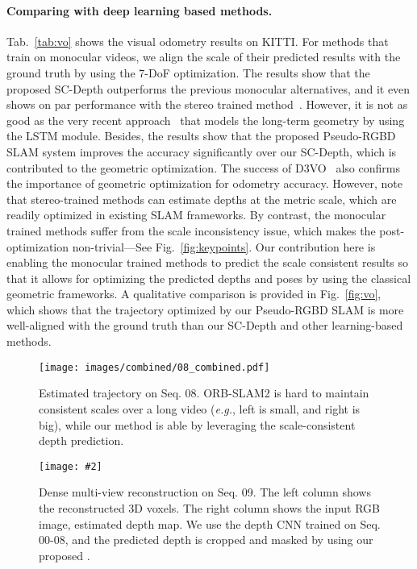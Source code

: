\documentclass[twocolumn]{svjour3}
\renewcommand{\cite}[1]{\textcolor{blue}{\citep{#1}}}
\def\eg{\emph{e.g.}}
\newcommand{\figref}[1]{Fig.~\ref{#1}}
\newcommand{\tabref}[1]{Tab.~\ref{#1}}
\newcommand{\addImg}[2][0.495]{\texttt{[image: \#2]}}
\begin{document}
\paragraph{Comparing with deep learning based methods.}
\tabref{tab:vo} shows the visual odometry results on KITTI.
For methods that train on monocular videos,
we align the scale of their predicted results with the ground truth by using the 7-DoF optimization.
The results show that the proposed SC-Depth outperforms the previous monocular alternatives,
and it even shows on par performance with the stereo trained method~\cite{li2018undeepvo}.
However, it is not as good as the very recent approach~\cite{zou2020learning} that models the long-term geometry by using the LSTM module.
Besides, the results show that the proposed Pseudo-RGBD SLAM system improves the accuracy significantly over our SC-Depth,
which is contributed to the geometric optimization.
The success of D3VO~\cite{yang2020d3vo} also confirms the importance of geometric optimization for odometry accuracy.
However, note that stereo-trained methods can estimate depths at the metric scale,
which are readily optimized in existing SLAM frameworks.
By contrast, the monocular trained methods suffer from the scale inconsistency issue,
which makes the post-optimization non-trivial---See \figref{fig:keypoints}.
Our contribution here is enabling the monocular trained methods to predict the scale consistent results
so that it allows for optimizing the predicted depths and poses by using the classical geometric frameworks.
A qualitative comparison is provided in \figref{fig:vo},
which shows that the trajectory optimized by our Pseudo-RGBD SLAM is more well-aligned with the ground truth than our SC-Depth and other learning-based methods.





\begin{figure}[t]
\centering
\texttt{[image: images/combined/08\_combined.pdf]} \\
\caption{Estimated trajectory on Seq. 08. 
ORB-SLAM2 is hard to maintain consistent scales over a long video (\eg, left is small, and right is big),
while our method is able by leveraging the scale-consistent depth prediction.
}
\label{fig:scale}
\end{figure}


\begin{figure*}[t]
  \centering
  \addImg[1]{demo-screenshot-03.pdf}
  \caption{Dense multi-view reconstruction on Seq. 09. 
    The left column shows the reconstructed 3D voxels. 
    The right column shows the input RGB image, estimated depth map.
    We use the depth CNN trained on Seq. 00-08, and the predicted depth is cropped and masked by using our proposed . 
}\label{fig:demo}
\end{figure*}
\end{document}
